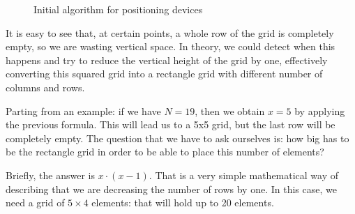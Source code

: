 \begin{figure}[htbp]
  \centering
  \caption{Initial algorithm for positioning devices}
  \label{fig:algorithm-boxes}
\end{figure}

It is easy to see that, at certain points, a whole row of the grid is completely empty, so we are wasting vertical space.
In theory, we could detect when this happens and try to reduce the vertical height of the grid by one, effectively converting this squared grid into a rectangle grid with different number of columns and rows.

Parting from an example: if we have $N = 19$, then we obtain $x = 5$ by applying the previous formula.
This will lead us to a 5x5 grid, but the last row will be completely empty. The question that we have to ask ourselves is:
how big has to be the rectangle grid in order to be able to place this number of elements?

Briefly, the answer is $x \cdot (x - 1)$.
That is a very simple mathematical way of describing that we are decreasing the number of rows by one.
In this case, we need a grid of $5 \times 4$ elements: that will hold up to 20 elements.

